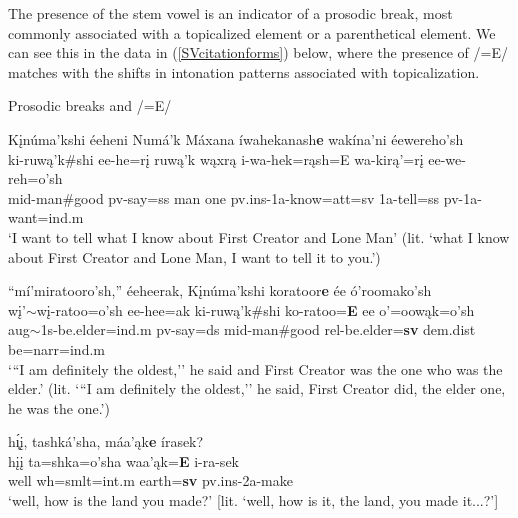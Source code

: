 The presence of the stem vowel is an indicator of a prosodic break, most commonly associated with a topicalized element or a parenthetical element. We can see this in the data in (\ref{SVcitationforms}) below, where the presence of /=E/ matches with the shifts in intonation patterns associated with topicalization.

\begin{exe}
\item\label{SVcitationforms} Prosodic breaks and /=E/
    \begin{xlist}
    \item\label{SVcitationforms1} \glll Kįnúma'kshi éeheni Numá'k Máxana íwahekanash\textbf{e} wakína'ni éewereho'sh\\
    ki-ruwą'k\#shi ee-he=rį ruwą'k wąxrą i-wa-hek=rąsh=E wa-kirą'=rį ee-we-reh=o'sh\\
    mid-\textnormal{man}\#\textnormal{good} pv-\textnormal{say}=ss \textnormal{man} \textnormal{one} pv.ins-1a-\textnormal{know}=att=sv 1a-\textnormal{tell}=ss pv-1a-\textnormal{want}=ind.m\\
    \glt `I want to tell what I know about First Creator and Lone Man' (lit. `what I know about First Creator and Lone Man, I want to tell it to you.') \citep[1]{hollow1973a}
    
    \item\label{SVcitationforms2} \glll ``mí'miratooro'sh,'' éeheerak, Kįnúma'kshi koratoor\textbf{e} ée ó'roomako'sh\\
    wį'$\sim$wį-ratoo=o'sh ee-hee=ak ki-ruwą'k\#shi ko-ratoo=\textbf{E} ee o'=oowąk=o'sh\\
    aug$\sim$1s-\textnormal{be.elder}=ind.m pv-\textnormal{say}=ds mid-\textnormal{man}\#\textnormal{good} rel-\textnormal{be.elder}=\textbf{sv} dem.dist \textnormal{be}=narr=ind.m\\
    \glt `{``}I am definitely the oldest,'' he said and First Creator was the one who was the elder.' (lit. `{``}I am definitely the oldest,'' he said, First Creator did, the elder one, he was the one.') \citep[2]{hollow1973a}
    
    \item\label{SVcitationforms3} \glll h\'{ı̨}į, tashká'sha, máa'ąk\textbf{e} írasek?\\
    hįį ta=shka=o'sha waa'ąk=\textbf{E} i-ra-sek\\
    \textnormal{well} wh=smlt=int.m \textnormal{earth}=\textbf{sv} pv.ins-2a-\textnormal{make}\\
    \glt `well, how is the land you made?' [lit. `well, how is it, the land, you made it...?'] \citep[10]{hollow1973a}
    
    \end{xlist}

\end{exe}

